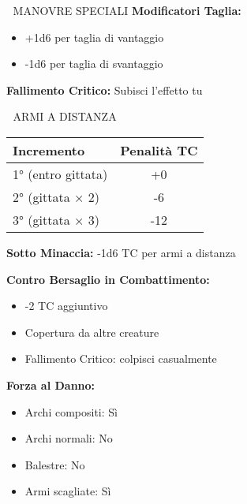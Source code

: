 \documentclass[10pt,a4paper,landscape]{article}
\begin{document}
\begin{multicols}{4}
\begin{mainsection}{🤺 MANOVRE SPECIALI}
			\textbf{Modificatori Taglia:}
			\begin{itemize}[noitemsep,leftmargin=8pt]
				\item +1d6 per taglia di vantaggio
				\item -1d6 per taglia di svantaggio
			\end{itemize}
			
			\textbf{Fallimento Critico:} Subisci l'effetto tu
		\end{mainsection}
		
		\begin{mainsection}{🏹 ARMI A DISTANZA}
			\begin{tabular}{@{}lc@{}}
				\toprule
				\textbf{Incremento} & \textbf{Penalità TC} \\
				\midrule
				1° (entro gittata) & +0 \\
				2° (gittata × 2) & -6 \\
				3° (gittata × 3) & -12 \\
				\bottomrule
			\end{tabular}
			\medskip
			\textbf{Sotto Minaccia:} -1d6 TC per armi a distanza
			
			\textbf{Contro Bersaglio in Combattimento:}
			\begin{itemize}[noitemsep,leftmargin=8pt]
				\item -2 TC aggiuntivo
				\item Copertura da altre creature
				\item Fallimento Critico: colpisci casualmente
			\end{itemize}
			
			\textbf{Forza al Danno:}
			\begin{itemize}[noitemsep,leftmargin=8pt]
				\item Archi compositi: Sì
				\item Archi normali: No
				\item Balestre: No
				\item Armi scagliate: Sì
			\end{itemize}
		\end{mainsection}
		
		\columnbreak
		

\end{multicols}
\end{document}
